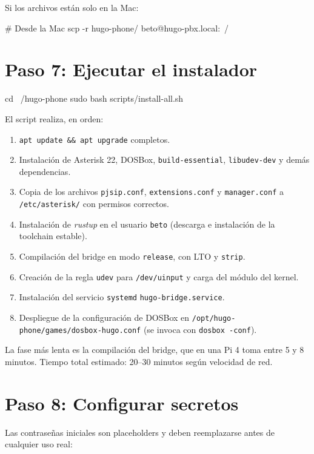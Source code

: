 Si los archivos están solo en la Mac:

\begin{shellcode}
# Desde la Mac
scp -r hugo-phone/ beto@hugo-pbx.local:~/
\end{shellcode}

\section{Paso 7: Ejecutar el instalador}

\begin{shellcode}
cd ~/hugo-phone
sudo bash scripts/install-all.sh
\end{shellcode}

El script realiza, en orden:

\begin{enumerate}
  \item \texttt{apt update \&\& apt upgrade} completos.
  \item Instalación de Asterisk 22, DOSBox, \texttt{build-essential}, \texttt{libudev-dev} y demás dependencias.
  \item Copia de los archivos \texttt{pjsip.conf}, \texttt{extensions.conf} y \texttt{manager.conf} a \texttt{/etc/asterisk/} con permisos correctos.
  \item Instalación de \emph{rustup} en el usuario \texttt{beto} (descarga e instalación de la toolchain estable).
  \item Compilación del bridge en modo \texttt{release}, con LTO y \texttt{strip}.
  \item Creación de la regla \texttt{udev} para \texttt{/dev/uinput} y carga del módulo del kernel.
  \item Instalación del servicio \texttt{systemd} \texttt{hugo-bridge.service}.
  \item Despliegue de la configuración de DOSBox en \texttt{/opt/hugo-phone/games/dosbox-hugo.conf} (se invoca con \texttt{dosbox -conf}).
\end{enumerate}

La fase más lenta es la compilación del bridge, que en una Pi 4 toma entre 5 y 8 minutos. Tiempo total estimado: 20--30 minutos según velocidad de red.

\section{Paso 8: Configurar secretos}

Las contraseñas iniciales son placeholders y deben reemplazarse antes de cualquier uso real:

